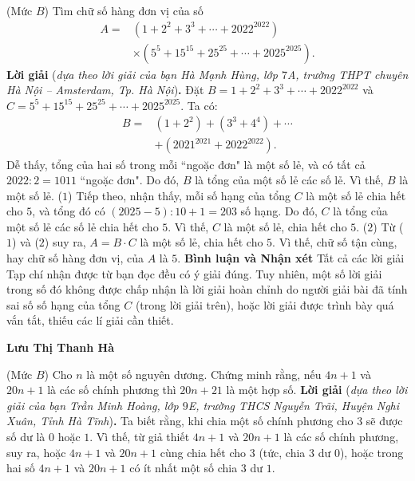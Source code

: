 \begin{multicols}{2}
	(Mức $B$) Tìm chữ số hàng đơn vị của số
	\begin{align*}
		A = &\left( {1 + {2^2} + {3^3} +  \cdots  + {{2022}^{2022}}} \right)\\
		&\times\!\left( {{5^5} + {{15}^{15}} + {{25}^{25}} +  \cdots  + {{2025}^{2025}}} \right)\!.
	\end{align*}
	\textbf{Lời giải} (\textit{dựa theo lời giải của bạn Hà Mạnh Hùng, lớp $7$A, trường THPT chuyên Hà Nội -- Amsterdam, Tp. Hà Nội})\textbf{.}
	\vskip 0.05cm
	Đặt  $B = 1 + {2^2} + {3^3} +  \cdots  + {2022^{2022}}$ và $C = {5^5} + {15^{15}} + {25^{25}} +  \cdots  + {2025^{2025}}$.
	\vskip 0.1cm 
	Ta có:
	\begin{align*}
		B = &\left( {1 + {2^2}} \right) + \left( {{3^3} + {4^4}} \right) +  \cdots\\
		  &+ \left( {{{2021}^{2021}} + {{2022}^{2022}}} \right).
	\end{align*}
	Dễ thấy, tổng của hai số trong mỗi ``ngoặc đơn" là một số lẻ, và có tất cả $2022 : 2 = 1011$ ``ngoặc đơn". Do đó, $B$ là tổng của một số lẻ các số lẻ. Vì thế, $B$ là một số lẻ.   \hfill ($1$)
	\vskip 0.05cm
	Tiếp theo, nhận thấy, mỗi số hạng của tổng $C$ là một số lẻ chia hết cho $5$, và tổng đó có $(2025 - 5) : 10 + 1 = 203$ số hạng. Do đó, $C$ là tổng của một số lẻ các số lẻ chia hết cho $5$. Vì thế, $C$ là một số lẻ, chia hết cho $5$. \hfill ($2$)
	\vskip 0.05cm
	Từ ($1$) và ($2$) suy ra, $A = B \cdot C$  là một số lẻ, chia hết cho $5$. Vì thế, chữ số tận cùng, hay chữ số hàng đơn vị, của $A$ là $5$.
	\vskip 0.05cm
	\textbf{Bình luận và Nhận xét}
	\vskip 0.05cm
	Tất cả các lời giải Tạp chí nhận được từ bạn đọc đều có ý giải đúng. Tuy nhiên, một số lời giải trong số đó không được chấp nhận là lời giải hoàn chỉnh do người giải bài đã tính sai số số hạng của tổng $C$ (trong lời giải trên), hoặc lời giải được trình bày quá vắn tắt, thiếu các lí giải cần thiết.
	\begin{flushright}
		\textbf{Lưu Thị Thanh Hà}
	\end{flushright}
	{}
	(Mức $B$) Cho $n$ là một số nguyên dương. Chứng minh rằng, nếu $4n + 1$ và $20n + 1$ là các số chính phương thì $20n + 21$ là một hợp số.
	\vskip 0.05cm
	\textbf{Lời giải} (\textit{dựa theo lời giải của bạn Trần Minh Hoàng, lớp $9$E, trường THCS Nguyễn Trãi, Huyện Nghi Xuân, Tỉnh Hà Tĩnh})\textbf{.}
	\vskip 0.05cm
	Ta biết rằng, khi chia một số chính phương cho $3$ sẽ được số dư là $0$ hoặc $1$. Vì thế, từ giả thiết $4n + 1$ và $20n + 1$ là các số chính phương, suy ra, hoặc $4n + 1$ và $20n + 1$ cùng chia hết cho $3$ (tức, chia $3$ dư $0$), hoặc trong hai số $4n + 1$ và $20n + 1$ có ít nhất một số chia $3$ dư $1$.

\end{multicols}
